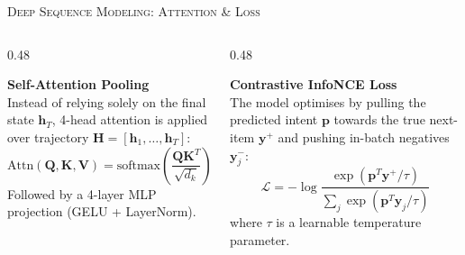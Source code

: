 \documentclass[xcolor=dvipsnames, aspectratio=1610]{beamer}
\begin{document}
\begin{frame}{\textsc{Deep Sequence Modeling: Attention \& Loss}}

  \begin{columns}[T]
    \begin{column}{0.48\textwidth}
      \begin{CommentBox}
        \textbf{Self-Attention Pooling} \\
        Instead of relying solely on the final state $\mathbf{h}_T$, 4-head attention is applied over trajectory $\mathbf{H} = [\mathbf{h}_1, \dots, \mathbf{h}_T]$:
        \begin{equation}
            \text{Attn}(\mathbf{Q}, \mathbf{K}, \mathbf{V}) = \text{softmax}\left(\frac{\mathbf{Q}\mathbf{K}^T}{\sqrt{d_k}}\right)\mathbf{V}
        \end{equation}
        Followed by a 4-layer MLP projection (GELU + LayerNorm).
      \end{CommentBox}
    \end{column}
    \begin{column}{0.48\textwidth}
      \begin{ProposalBox}
        \textbf{Contrastive InfoNCE Loss} \\
        The model optimises by pulling the predicted intent $\mathbf{p}$ towards the true next-item $\mathbf{y}^+$ and pushing in-batch negatives $\mathbf{y}^-_j$:
        \begin{equation}
            \mathcal{L} = -\log \frac{\exp(\mathbf{p}^T \mathbf{y}^+ / \tau)}{\sum_{j} \exp(\mathbf{p}^T \mathbf{y}_j / \tau)}
        \end{equation}
        where $\tau$ is a learnable temperature parameter.
      \end{ProposalBox}
    \end{column}
  \end{columns}

\end{frame}

\end{document}
